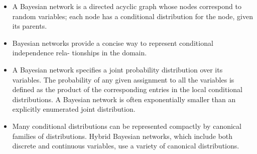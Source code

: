 \documentclass[11pt]{article}
\begin{document}
\begin{itemize}
\item A Bayesian network is a directed acyclic graph whose nodes correspond to random variables; each node has a conditional distribution for the node, given its parents.

\item Bayesian networks provide a concise way to represent conditional independence rela- tionships in the domain.

\item A Bayesian network specifies a joint probability distribution over its variables. The probability of any given assignment to all the variables is defined as the product of the corresponding entries in the local conditional distributions. A Bayesian network is often exponentially smaller than an explicitly enumerated joint distribution.

\item Many conditional distributions can be represented compactly by canonical families of distributions. Hybrid Bayesian networks, which include both discrete and continuous variables, use a variety of canonical distributions.
\end{itemize}
\end{document}
